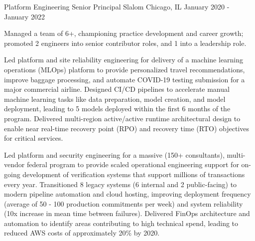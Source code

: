 \begin{cventries}
  \cventry
    {Platform Engineering Senior Principal} %
    {Slalom} %
    {Chicago, IL} %
    {January 2020 - January 2022} %
    {
      \begin{cvitems} %
        \item {Managed a team of 6+, championing practice development and career growth; promoted 2 engineers into senior contributor roles, and 1 into a leadership role.}
        \item {Led platform and site reliability engineering for delivery of a machine learning operations (MLOps) platform to provide personalized travel recommendations, improve baggage processing, and automate COVID-19 testing submission for a major commercial airline. Designed CI/CD pipelines to accelerate manual machine learning tasks like data preparation, model creation, and model deployment, leading to 5 models deployed within the first 6 months of the program. Delivered multi-region active/active runtime architectural design to enable near real-time recovery point (RPO) and recovery time (RTO) objectives for critical services.}
        \item {Led platform and security engineering for a massive (150+ consultants), multi-vendor federal program to provide scaled operational engineering support for on-going development of verification systems that support millions of transactions every year. Transitioned 8 legacy systems (6 internal and 2 public-facing) to modern pipeline automation and cloud hosting, improving deployment frequency (average of 50 - 100 production commitments per week) and system reliability (10x increase in mean time between failures). Delivered FinOps architecture and automation to identify areas contributing to high technical spend, leading to reduced AWS costs of approximately 20\% by 2020.}
      \end{cvitems}
    }


\end{cventries}
